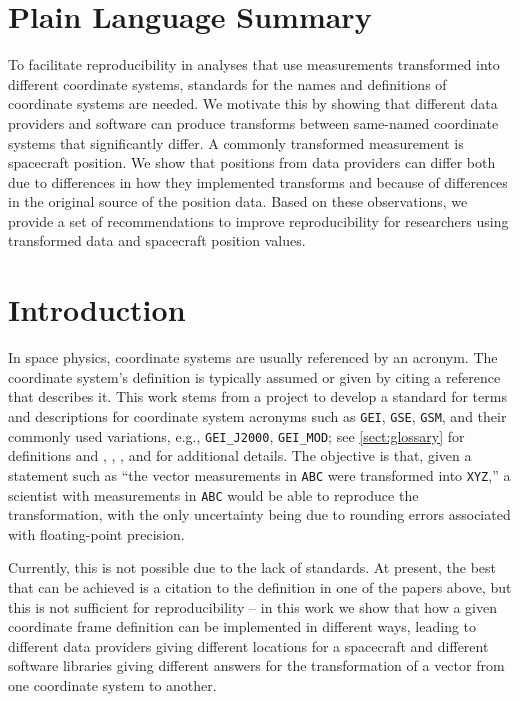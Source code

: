\documentclass[draft]{agujournal2019}
\begin{document}
\section*{Plain Language Summary}

To facilitate reproducibility in analyses that use measurements transformed into different coordinate systems, standards for the names and definitions of coordinate systems are needed. We motivate this by showing that different data providers and software can produce transforms between same-named coordinate systems that significantly differ. A commonly transformed measurement is spacecraft position. We show that positions from data providers can differ both due to differences in how they implemented transforms and because of differences in the original source of the position data. Based on these observations, we provide a set of recommendations to improve reproducibility for researchers using transformed data and spacecraft position values.

\section{Introduction}

In space physics, coordinate systems are usually referenced by an acronym. The coordinate system's definition is typically assumed or given by citing a reference that describes it. This work stems from a project to develop a standard for terms and descriptions for coordinate system acronyms such as \texttt{GEI}, \texttt{GSE}, \texttt{GSM}, and their commonly used variations, e.g., \texttt{GEI\_J2000}, \texttt{GEI\_MOD}; see \ref{sect:glossary} for definitions and , , , and  for additional details. The objective is that, given a statement such as ``the vector measurements in \texttt{ABC} were transformed into \texttt{XYZ},'' a scientist with measurements in \texttt{ABC} would be able to reproduce the transformation, with the only uncertainty being due to rounding errors associated with floating-point precision.

Currently, this is not possible due to the lack of standards. At present, the best that can be achieved is a citation to the definition in one of the papers above, but this is not sufficient for reproducibility -- in this work we show that how a given coordinate frame definition can be implemented in different ways, leading to different data providers giving different locations for a spacecraft and different software libraries giving different answers for the transformation of a vector from one coordinate system to another.
\end{document}
